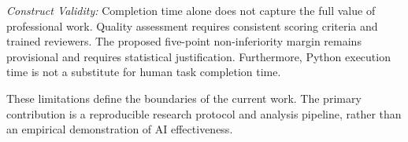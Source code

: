 \textit{Construct Validity:}
Completion time alone does not capture the full value
of professional work. Quality assessment requires
consistent scoring criteria and trained reviewers.
The proposed five-point non-inferiority margin remains
provisional and requires statistical justification.
Furthermore, Python execution time is not a substitute
for human task completion time.

These limitations define the boundaries of the current
work. The primary contribution is a reproducible
research protocol and analysis pipeline, rather than
an empirical demonstration of AI effectiveness.

